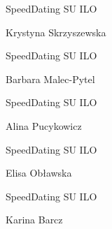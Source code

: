 \documentclass[a4paper,12pt]{article}
\begin{document}
\begin{minipage}[c]{\textwidth}
  \hline

  \hspace{0.5cm}

  SpeedDating SU ILO

  Krystyna Skrzyszewska

  \hspace{0.5cm}

  \hline
\end{minipage}



\begin{minipage}[c]{\textwidth}
  \hline

  \hspace{0.5cm}

  SpeedDating SU ILO

  Barbara Malec-Pytel

  \hspace{0.5cm}

  \hline
\end{minipage}



\begin{minipage}[c]{\textwidth}
  \hline

  \hspace{0.5cm}

  SpeedDating SU ILO

  Alina Pucykowicz

  \hspace{0.5cm}

  \hline
\end{minipage}



\begin{minipage}[c]{\textwidth}
  \hline

  \hspace{0.5cm}

  SpeedDating SU ILO

  Elisa Obławska

  \hspace{0.5cm}

  \hline
\end{minipage}



\begin{minipage}[c]{\textwidth}
  \hline

  \hspace{0.5cm}

  SpeedDating SU ILO

  Karina Barcz

  \hspace{0.5cm}

  \hline
\end{minipage}
\end{document}
